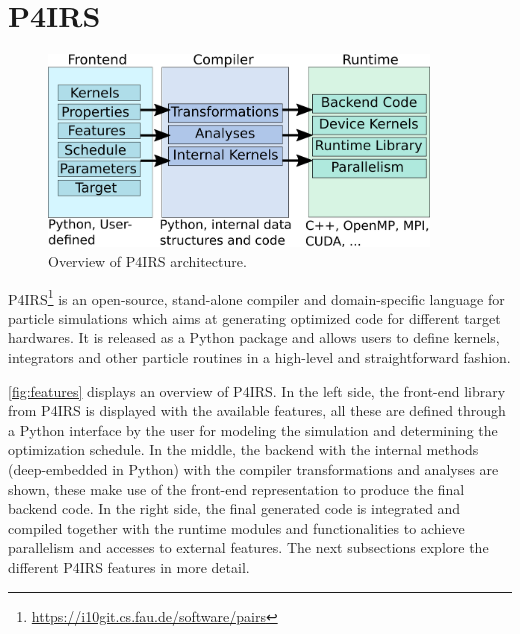 \documentclass[preprint,12pt]{elsarticle}
\begin{document}
\section{P4IRS}
\label{sec:pairs}


\begin{figure}[htb]
  \centering
  \includegraphics[width=0.9\textwidth]{pairs_overview.png}
  \caption{Overview of P4IRS architecture.}
  \label{fig:features}
\end{figure}

P4IRS\footnote{\url{https://i10git.cs.fau.de/software/pairs}} is an open-source, stand-alone compiler and domain-specific language for particle simulations which aims at generating optimized code for different target hardwares.
It is released as a Python package and allows users to define kernels, integrators and other particle routines in a high-level and straightforward fashion.

\autoref{fig:features} displays an overview of P4IRS.
In the left side, the front-end library from P4IRS is displayed with the available features, all these are defined through a Python interface by the user for modeling the simulation and determining the optimization schedule.
In the middle, the backend with the internal methods (deep-embedded in Python) with the compiler transformations and analyses are shown, these make use of the front-end representation to produce the final backend code.
In the right side, the final generated code is integrated and compiled together with the runtime modules and functionalities to achieve parallelism and accesses to external features.
The next subsections explore the different P4IRS features in more detail.
\end{document}
